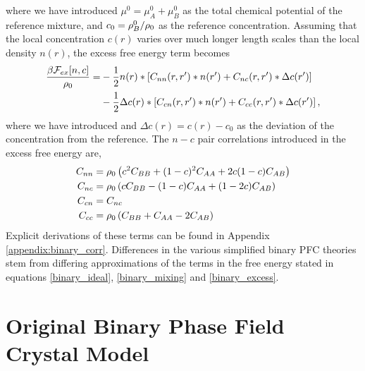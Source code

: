 %
where we have introduced $\mu^0=\mu_A^0+\mu_B^0$ as the total chemical
potential of the reference mixture, and $c_0 = \rho_B^0 / \rho_0$ as the reference
concentration. Assuming that the local concentration $c(r)$ varies over much
longer length scales than the local density $n(r)$, the excess free energy term
becomes  
%
\begin{align}
    \label{binary_excess}
    \frac{\beta\mathcal{F}_{ex}[n, c]}{\rho_0}
        = &-\frac{1}{2} n(r) \ast \left[ 
            C_{nn}(r, r^\prime) \ast n(r^\prime) 
          + C_{nc}(r, r^\prime) \ast \Delta c(r^\prime)\right] \\
        &-\frac{1}{2} \Delta c(r) \ast \left[
            C_{cn}(r, r^\prime) \ast n(r^\prime) 
          + C_{cc}(r, r^\prime) \ast \Delta c(r^\prime)\right], \nonumber
\end{align}
%
where we have introduced  and $\Delta c(r) = c(r) - c_0$ as the deviation of the 
concentration from the reference.  The $n-c$ pair correlations introduced in the 
excess free energy are,
%
\begin{align}
    C_{nn} &= \rho_0\left(c^2 C_{BB} + (1 - c)^2C_{AA} + 2c(1-c)C_{AB}\right) \label{orig_nnC}\\
    C_{nc} &= \rho_0\left(c C_{BB} - (1 - c) C_{AA} + (1 - 2c)C_{AB}\right) \\
    C_{cn} &= C_{nc} \\
    C_{cc} &= \rho_0\left(C_{BB} + C_{AA} - 2 C_{AB}\right)
\end{align}
%
Explicit derivations of these terms can be found in Appendix \ref{appendix:binary_corr}.
Differences in the various simplified binary PFC theories stem from differing
approximations of the terms in the free energy stated in equations 
\ref{binary_ideal}, \ref{binary_mixing} and \ref{binary_excess}.

\section{Original Binary Phase Field Crystal Model} %

